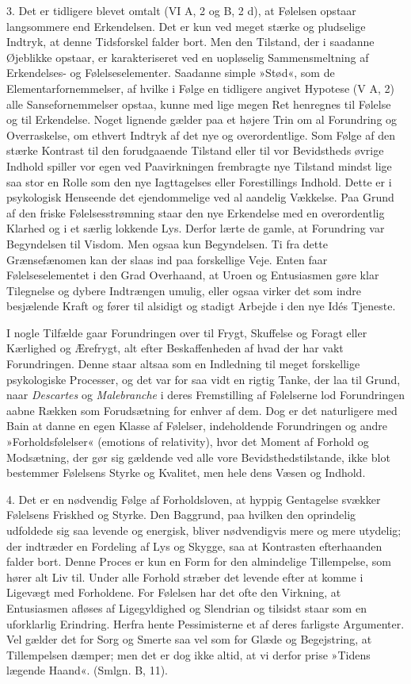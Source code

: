 \documentclass[12pt,a4paper,openany]{book}
\newcommand{\opage}[1]{\marginnote{\footnotesize\textit{[#1]}}}
\begin{document}
3. Det er tidligere blevet omtalt (VI A, 2 og B, 2 d), at Følelsen
opstaar langsommere end Erkendelsen. Det er kun ved meget stærke og
pludselige Indtryk, at denne Tidsforskel falder bort. Men den Tilstand,
der i saadanne Øjeblikke opstaar, er karakteriseret ved en uopløselig
Sammensmeltning af Erkendelses- og Følelseselementer. Saadanne simple
»Stød«, som de Elementarfornemmelser, af hvilke i Følge en tidligere
angivet Hypotese (V A, 2) alle Sansefornemmelser opstaa, kunne med lige
megen Ret henregnes til Følelse og til Erkendelse. Noget lignende gælder
paa et højere Trin om al Forundring og Overraskelse, om ethvert Indtryk
af det nye og overordentlige. Som Følge af den stærke Kontrast til den
forudgaaende Tilstand eller til vor Bevidstheds øvrige Indhold spiller
vor egen ved Paavirkningen frembragte nye Tilstand mindst lige saa stor
en Rolle som den nye Iagttagelses eller Forestillings Indhold. Dette er
i psykologisk Henseende det ejendommelige ved al aandelig Vækkelse. Paa
Grund af den friske Følelsesstrømning staar den nye Erkendelse med en
overordentlig Klarhed og i et særlig lokkende Lys. Derfor lærte de
gamle, at Forundring var Begyndelsen til Visdom. Men ogsaa kun
Begyndelsen. Ti fra dette Grænsefænomen kan der slaas ind paa
forskellige Veje. Enten faar Følelseselementet i den Grad Overhaand, at
Uroen og Entusiasmen gøre klar Tilegnelse og dybere Indtrængen umulig,
eller ogsaa virker det som indre besjælende Kraft og fører til alsidigt
og stadigt Arbejde i den nye Idés Tjeneste.

I nogle Tilfælde gaar Forundringen over til Frygt, Skuffelse og Foragt
eller Kærlighed og Ærefrygt, alt efter Beskaffenheden af hvad der har
vakt Forundringen. Denne staar altsaa som en Indledning til meget
forskellige psykologiske Processer, og det var for saa vidt en rigtig
Tanke, der laa til Grund,
\opage{331}naar \emph{Descartes} og \emph{Malebranche} i deres
Fremstilling af Følelserne lod Forundringen aabne Rækken som
Forudsætning for enhver af dem. Dog er det naturligere med Bain at danne
en egen Klasse af Følelser, indeholdende Forundringen og andre
»Forholdsfølelser« (emotions of relativity), hvor det Moment af Forhold
og Modsætning, der gør sig gældende ved alle vore Bevidsthedstilstande,
ikke blot bestemmer Følelsens Styrke og Kvalitet, men hele dens Væsen og
Indhold.

4. Det er en nødvendig Følge af Forholdsloven, at hyppig Gentagelse
svækker Følelsens Friskhed og Styrke. Den Baggrund, paa hvilken den
oprindelig udfoldede sig saa levende og energisk, bliver nødvendigvis
mere og mere utydelig; der indtræder en Fordeling af Lys og Skygge, saa
at Kontrasten efterhaanden falder bort. Denne Proces er kun en Form for
den almindelige Tillempelse, som hører alt Liv til. Under alle Forhold
stræber det levende efter at komme i Ligevægt med Forholdene. For
Følelsen har det ofte den Virkning, at Entusiasmen afløses af
Ligegyldighed og Slendrian og tilsidst staar som en uforklarlig
Erindring. Herfra hente Pessimisterne et af deres farligste Argumenter.
Vel gælder det for Sorg og Smerte saa vel som for Glæde og Begejstring,
at Tillempelsen dæmper; men det er dog ikke altid, at vi derfor prise
»Tidens lægende Haand«. (Smlgn. B, 11).
\end{document}
